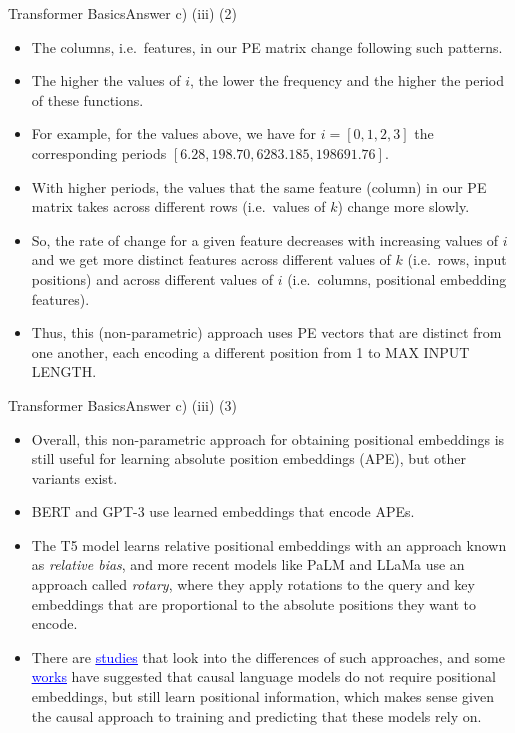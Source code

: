 \documentclass[t]{beamer}
\begin{document}
\begin{frame}{Transformer Basics}{Answer c) (iii) (2)}
    \begin{itemize}
        \item The columns, i.e.\ features, in our PE matrix change following
              such patterns.
        \item The higher the values of $i$, the lower the frequency and
              the higher the period of these functions.
        \item For example, for the values above, we have for
              $i = [0, 1, 2, 3]$ the corresponding periods
              $[6.28, 198.70, 6283.185, 198691.76]$.
        \item With higher periods, the values that the same feature (column) in
              our PE matrix takes across different rows (i.e.\ values of $k$)
              change more slowly.
        \item So, the rate of change for a given feature decreases with
              increasing values of $i$ and we get more distinct features
              across different values of $k$ (i.e.\ rows, input positions) and
              across different values of $i$ (i.e.\ columns, positional
              embedding features).
        \item Thus, this (non-parametric) approach uses PE vectors
              that are distinct from one another, each encoding a
              different position from 1 to MAX INPUT LENGTH.
    \end{itemize}
\end{frame}

\begin{frame}{Transformer Basics}{Answer c) (iii) (3)}
    \begin{itemize}
        \item Overall, this non-parametric approach for obtaining
              positional embeddings is still useful for learning absolute
              position embeddings (APE), but other variants exist.
        \item BERT and GPT-3 use learned embeddings that encode APEs.
        \item The T5 model learns relative positional embeddings with an
              approach known as \emph{relative bias}, and more recent
              models like PaLM and LLaMa use an approach called
              \emph{rotary}, where they apply rotations to the query and
              key embeddings that are proportional to the absolute
              positions they want to encode.
        \item There are
              \href{https://arxiv.org/pdf/2305.19466.pdf}{\textcolor{blue}{\underline{studies}}}
              that look into the differences of such approaches, and some
              \href{https://aclanthology.org/2022.findings-emnlp.99.pdf}{\textcolor{blue}{\underline{works}}}
              have suggested that causal language models do not require
              positional embeddings, but still learn positional
              information, which makes sense given the causal approach
              to training and predicting that these models rely on.
    \end{itemize}
\end{frame}
\end{document}
